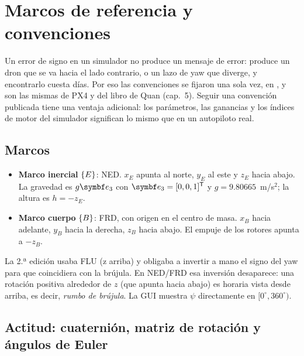 \section{Marcos de referencia y convenciones}
\label{sec:marcos}

Un error de signo en un simulador no produce un mensaje de error: produce un
dron que se va hacia el lado contrario, o un lazo de yaw que diverge, y
encontrarlo cuesta días. Por eso las convenciones se fijaron una sola vez, en
, y son las mismas de PX4 y del libro de Quan
\cite{qq17} (cap.~5). Seguir una convención publicada tiene una ventaja
adicional: los parámetros, las ganancias y los índices de motor del
simulador significan lo mismo que en un autopiloto real.

\subsection{Marcos}

\begin{itemize}
\item \textbf{Marco inercial} $\{E\}$: NED. $x_E$ apunta al norte, $y_E$ al este
y $z_E$ hacia abajo. La gravedad es $g\eu$ con $\eu=[0,0,1]\T$ y
$g=9.80665$~m/s$^2$; la altura es $h=-z_E$.
\item \textbf{Marco cuerpo} $\{B\}$: FRD, con origen en el centro de masa.
$x_B$ hacia adelante, $y_B$ hacia la derecha, $z_B$ hacia abajo. El empuje de
los rotores apunta a $-z_B$.
\end{itemize}

La 2.ª edición usaba FLU (z arriba) y obligaba a invertir a mano el signo del
yaw para que coincidiera con la brújula. En NED/FRD esa inversión desaparece:
una rotación positiva alrededor de $z$ (que apunta hacia abajo) es horaria
vista desde arriba, es decir, \emph{rumbo de brújula}. La GUI muestra $\psi$
directamente en $[0^\circ,360^\circ)$.

\subsection{Actitud: cuaternión, matriz de rotación y ángulos de Euler}

